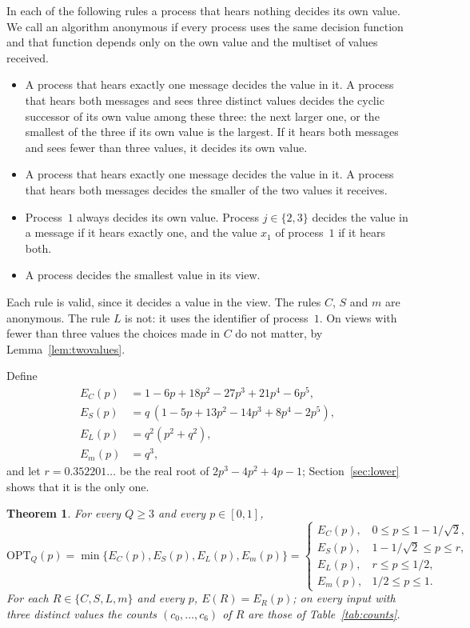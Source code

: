 \documentclass[11pt]{article}
\newtheorem{theorem}{Theorem}
\theoremstyle{remark}
\newcommand{\OPT}{\mathrm{OPT}}
\begin{document}
In each of the following rules a process that hears nothing decides its own value. We call an algorithm anonymous if every process uses the same decision function and that function depends only on the own value and the multiset of values received.
\begin{itemize}
\item[$C$:] A process that hears exactly one message decides the value in it. A process that hears both messages and sees three distinct values decides the cyclic successor of its own value among these three: the next larger one, or the smallest of the three if its own value is the largest. If it hears both messages and sees fewer than three values, it decides its own value.
\item[$S$:] A process that hears exactly one message decides the value in it. A process that hears both messages decides the smaller of the two values it receives.
\item[$L$:] Process~$1$ always decides its own value. Process $j\in\{2,3\}$ decides the value in a message if it hears exactly one, and the value $x_1$ of process~$1$ if it hears both.
\item[$m$:] A process decides the smallest value in its view.
\end{itemize}
Each rule is valid, since it decides a value in the view. The rules $C$, $S$ and $m$ are anonymous. The rule $L$ is not: it uses the identifier of process~$1$. On views with fewer than three values the choices made in $C$ do not matter, by Lemma~\ref{lem:twovalues}.

Define
\begin{align*}
E_C(p)&=1-6p+18p^2-27p^3+21p^4-6p^5,\\
E_S(p)&=q\,(1-5p+13p^2-14p^3+8p^4-2p^5),\\
E_L(p)&=q^2(p^2+q^2),\\
E_m(p)&=q^3,
\end{align*}
and let $r=0.352201\dots$ be the real root of $2p^3-4p^2+4p-1$; Section~\ref{sec:lower} shows that it is the only one.

\begin{theorem}\label{thm:main}
For every $Q\ge3$ and every $p\in[0,1]$,
\[
\OPT_Q(p)=\min\{E_C(p),E_S(p),E_L(p),E_m(p)\}=
\begin{cases}
E_C(p), & 0\le p\le 1-1/\sqrt2,\\
E_S(p), & 1-1/\sqrt2\le p\le r,\\
E_L(p), & r\le p\le 1/2,\\
E_m(p), & 1/2\le p\le 1.
\end{cases}
\]
For each $R\in\{C,S,L,m\}$ and every $p$, $E(R)=E_R(p)$; on every input with three distinct values the counts $(c_0,\dots,c_6)$ of $R$ are those of Table~\ref{tab:counts}.
\end{theorem}
\end{document}
